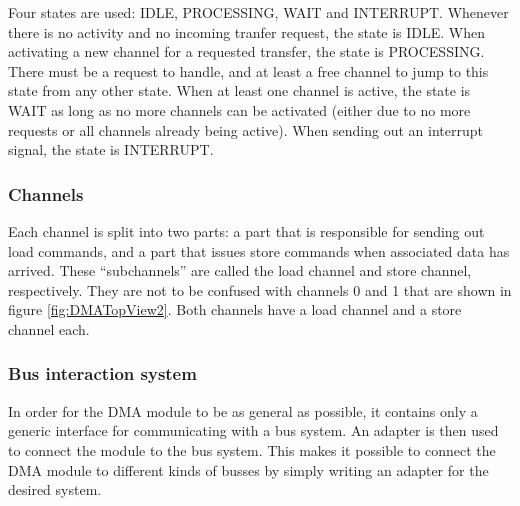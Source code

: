 Four states are used: IDLE, PROCESSING, WAIT and INTERRUPT.
Whenever there is no activity and no incoming tranfer request, the state is IDLE.
When activating a new channel for a requested transfer, the state is PROCESSING. 
There must be a request to handle, and at least a free channel to jump to this state from any other state.
When at least one channel is active, the state is WAIT as long as no more channels can be activated (either due to no more requests or all channels already being active).
When sending out an interrupt signal, the state is INTERRUPT.

\subsubsection{Channels}
Each channel is split into two parts: a part that is responsible for sending out load
commands, and a part that issues store commands when associated data has arrived. 
These ``subchannels'' are called the load channel and store channel, respectively.
They are not to be confused with channels 0 and 1 that are shown in figure \ref{fig:DMATopView2}.
Both channels have a load channel and a store channel each.

\subsubsection{Bus interaction system}
In order for the DMA module to be as general as possible, it contains only a generic
interface for communicating with a bus system. An adapter is then used to connect
the module to the bus system. This makes it possible to connect the DMA module to
different kinds of busses by simply writing an adapter for the desired system.

%
%
